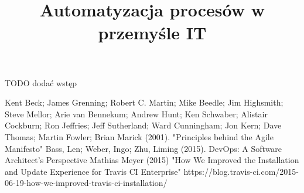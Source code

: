 \documentclass[twoside]{projektInzynierskiMS1}
\title{Automatyzacja procesów w przemyśle IT}
\begin{document}
TODO dodać wstęp









\begin{thebibliography}{12}

 Kent Beck; James Grenning; Robert C. Martin; Mike Beedle; Jim Highsmith; Steve Mellor; Arie van Bennekum; Andrew Hunt; Ken Schwaber; Alistair Cockburn; Ron Jeffries; Jeff Sutherland; Ward Cunningham; Jon Kern; Dave Thomas; Martin Fowler; Brian Marick (2001). "Principles behind the Agile Manifesto"
 Bass, Len; Weber, Ingo; Zhu, Liming (2015). DevOps: A Software Architect's Perspective
 Mathias Meyer (2015)  "How We Improved the Installation and Update Experience for Travis CI Enterprise" https://blog.travis-ci.com/2015-06-19-how-we-improved-travis-ci-installation/

\end{thebibliography}
\end{document}

